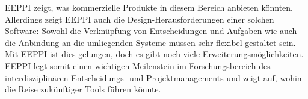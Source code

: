 	EEPPI zeigt, was kommerzielle Produkte in diesem Bereich anbieten könnten.
	Allerdings zeigt EEPPI auch die Design-Herausforderungen einer solchen Software:
	Sowohl die Verknüpfung von Entscheidungen und Aufgaben wie auch die Anbindung an die umliegenden Systeme müssen sehr flexibel gestaltet sein.
	Mit EEPPI ist dies gelungen, doch es gibt noch viele Erweiterungsmöglichkeiten.
	EEPPI legt somit einen wichtigen Meilenstein im Forschungsbereich des interdisziplinären Entscheidungs- und Projektmanagements und
	zeigt auf, wohin die Reise zukünftiger Tools führen könnte.
	
